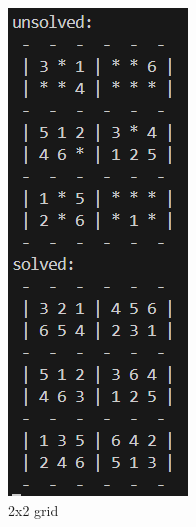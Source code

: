 \documentclass[]{final_report}
\begin{document}
\begin{figure}[ht]
\begin{minipage}{0.3\textwidth}
        \caption{2x2 grid} 
        \label{fig: terminal 2x2} 
    \end{minipage} 
    \hfill 
    \begin{minipage}{0.3\textwidth} 
        \includegraphics[width=\textwidth]{images/terminal 6x6.png} 

\end{minipage}
\end{figure}
\end{document}
